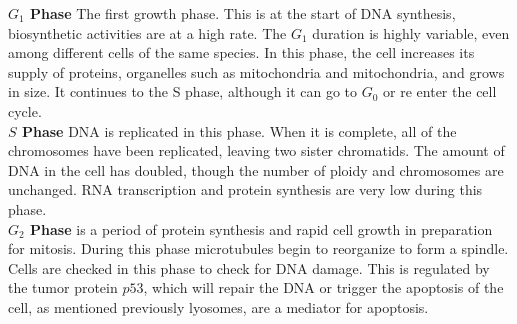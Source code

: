\textbf{$G_1$ Phase} The first growth phase. This is at the start of DNA synthesis, biosynthetic activities are at a high rate. The $G_1$ duration is highly variable, even among different cells of the same species. In this phase, the cell increases its supply of proteins, organelles such as mitochondria and mitochondria, and grows in size. It continues to the S phase, although it can go to $G_0$ or re enter the cell cycle.
\\

\noindent\textbf{$S$ Phase} DNA is replicated in this phase. When it is complete, all of the chromosomes have been replicated, leaving two sister chromatids. The amount of DNA in the cell has doubled, though the number of ploidy and chromosomes are unchanged. RNA transcription and protein synthesis are very low during this phase.
\\

\noindent\textbf{$G_2$ Phase} is a period of protein synthesis and rapid cell growth in preparation for mitosis. During this phase microtubules begin to reorganize to form a spindle. Cells are checked in this phase to check for DNA damage. This is regulated by the tumor protein $p53$, which will repair the DNA or trigger the apoptosis of the cell, as mentioned previously lyosomes, are a mediator for apoptosis.




